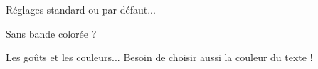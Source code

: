 \documentclass[10pt, a4paper]{../main/main}
\begin{document}
\begin{tdocshowcase}

\end{tdocshowcase}

\begin{tdocshowcase}
  Réglages standard ou par défaut...
\end{tdocshowcase}

\begin{tdocshowcase}[nostripe]
  Sans bande colorée ?
\end{tdocshowcase}

\begin{tdocshowcase}[color = orange]
  Les goûts et les couleurs... Besoin de choisir aussi la couleur du texte !
\end{tdocshowcase}
\end{document}
